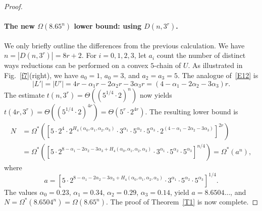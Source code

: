 \documentclass[11pt]{article}
\begin{document}
\begin{proof}
\paragraph{The new $\Omega(8.65^n)$ lower bound: using $D(n,3^r)$.}
We only briefly outline the differences from the previous calculation.
We have $n=|D(n,3^r)|=8r+2$.
For $i=0,1,2,3$, let $a_i$ count the number of distinct ways
reductions can be performed on a convex $5$-chain of $U$.
As illustrated in Fig.~\ref{f7}(right), we have $a_0=1$, $a_0=3$,
and $a_2=a_3=5$. The analogue of~\eqref{E12} is
\begin{equation*} \label{E14}
|L'|=|U'|=4r-\alpha_1 r - 2\alpha_2 r - 3\alpha_3 r =
(4-\alpha_1 - 2\alpha_2 - 3\alpha_3)r.
\end{equation*}
The estimate $t(n,3^r) =\Theta((5^{1/4} \cdot 2)^n)$
now yields $t(4r,3^r) =\Theta((5^{1/4} \cdot 2)^{4r})=\Theta(5^{r} \cdot 2^{4r})$.
The resulting lower bound is
\begin{align*} \label{E15}
N &= \Omega^* \left(
\left[ 5 \cdot 2^{4} \cdot 2^{H_4(\alpha_0,\alpha_1,\alpha_2,\alpha_3)}
\cdot 3^{\alpha_1} \cdot 5^{\alpha_2} \cdot 5^{\alpha_3}
\cdot 2^{(4-\alpha_1- 2\alpha_2 - 3\alpha_3)}
\right]^{2r} \right) \nonumber \\
&= \Omega^* \left(
\left[ 5 \cdot 2^{8-\alpha_1- 2\alpha_2 - 3\alpha_3
+ H_4(\alpha_0,\alpha_1,\alpha_2,\alpha_3)}
\cdot 3^{\alpha_1} \cdot 5^{\alpha_2} \cdot 5^{\alpha_3}
\right]^{n/4} \right) =
\Omega^* \left( a^n \right),
\end{align*}
where
$$ a=\left[5 \cdot 2^{8-\alpha_1- 2\alpha_2 - 3\alpha_3 +
H_4(\alpha_0,\alpha_1,\alpha_2,\alpha_3)}
\cdot 3^{\alpha_1} \cdot 5^{\alpha_2} \cdot 5^{\alpha_3}
\right]^{1/4}. $$
The values $\alpha_0=0.23$, $\alpha_1=0.34$, $\alpha_2=0.29$, $\alpha_3=0.14$,
yield $a= 8.6504\ldots$, and $N = \Omega^*(8.6504^n)=\Omega(8.65^n)$.
The proof of Theorem~\ref{T1} is now complete.
\end{proof}
\end{document}
